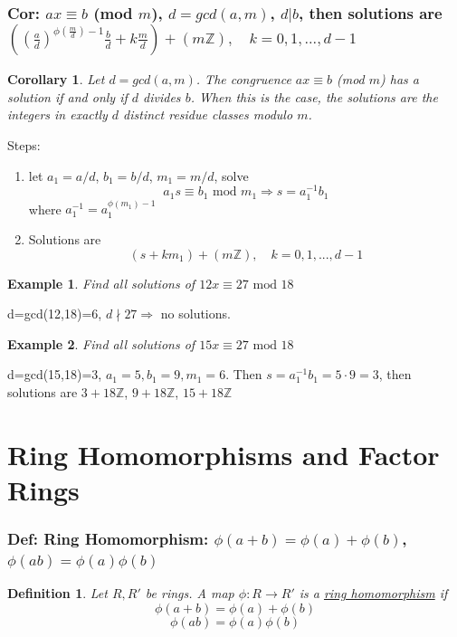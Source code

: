 \documentclass[11pt,a4paper]{article}
\newtheorem{example}{Example}
\newtheorem{corollary}{Corollary}
\newtheorem{definition}{Definition}
\begin{document}
\subsubsection{Cor: $ax \equiv b$ (mod $m$), $d=gcd(a,m)$, $d|b$, then solutions are $((\frac{a}{d})^{\phi(\frac{m}{d})-1}\frac{b}{d}+k\frac{m}{d})+(m \mathbb{Z}),\quad k=0,1,...,d-1$}
\begin{corollary}
    Let $d=gcd(a,m)$. The congruence $ax \equiv b$ (mod $m$) has a
    solution if and only if $d$ divides $b$. When this is the case, the solutions are the integers in
    exactly $d$ distinct residue classes modulo $m$.
\end{corollary}
Steps:
\begin{enumerate}[(1)]
    \item let $a_1=a/d$, $b_1=b/d$, $m_1=m/d$, solve $$a_1s\equiv b_1 \text{ mod } m_1 \Rightarrow	s=a_1^{-1}b_1$$
    where $a_1^{-1}=a_1^{\phi(m_1)-1}$
    \item Solutions are $$(s+km_1)+(m \mathbb{Z}),\quad k=0,1,...,d-1$$
\end{enumerate}
\begin{example}
Find all solutions of $12 x\equiv 27 \text{ mod }18$
\end{example}
d=gcd(12,18)=6, $d\nmid 27 \Rightarrow$ no solutions.

\begin{example}
    Find all solutions of $15 x\equiv 27 \text{ mod }18$
\end{example}
d=gcd(15,18)=3, $a_1=5,b_1=9,m_1=6$. Then $s=a_1^{-1}b_1=5\cdot 9=3$, then solutions are $3+18 \mathbb{Z}$, $9+18 \mathbb{Z}$, $15+18 \mathbb{Z}$



\section{Ring Homomorphisms and Factor Rings}

\subsubsection{Def: Ring Homomorphism: $\phi(a+b)=\phi(a)+\phi(b)$, $\phi(ab)=\phi(a)\phi(b)$}
\begin{definition}
    Let $R,R'$ be rings. A map $\phi:R \rightarrow R'$ is a \underline{ring homomorphism} if $$\phi(a+b)=\phi(a)+\phi(b)$$ $$\phi(ab)=\phi(a)\phi(b)$$
\end{definition}
\end{document}
